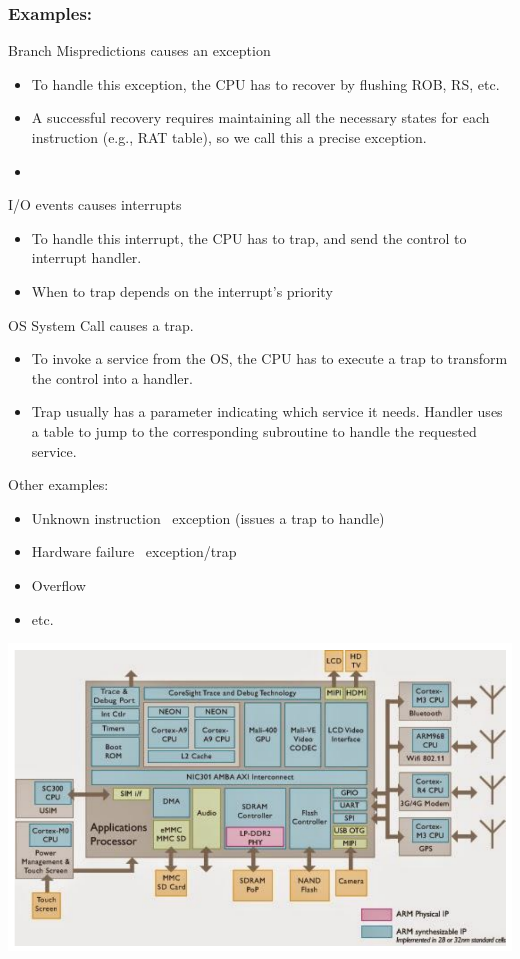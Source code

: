 \documentclass[10pt]{article}
\begin{document}
\subsubsection*{Examples:}
Branch Mispredictions causes an exception
\begin{itemize}
    \item To handle this exception, the CPU has to recover by flushing ROB, RS, etc.
    \item A successful recovery requires maintaining all the necessary states for each instruction (e.g., RAT table), so we call this a precise exception.
    \item 
\end{itemize}
I/O events causes interrupts
\begin{itemize}
    \item To handle this interrupt, the CPU has to trap, and send the control to interrupt handler.
    \item When to trap depends on the interrupt's priority
\end{itemize}
OS System Call causes a trap.
\begin{itemize}
    \item To invoke a service from the OS, the CPU has to execute a trap to transform the control into a handler.
    \item Trap usually has a parameter indicating which service it needs.  Handler uses a table to jump to the corresponding subroutine to handle the requested service.
\end{itemize}
Other examples:
\begin{itemize}
    \item Unknown instruction \textrightarrow~exception (issues a trap to handle)
    \item Hardware failure \textrightarrow~exception/trap
    \item Overflow
    \item etc.
\end{itemize}
\begin{center}
    \includegraphics*[width=\textwidth]{W10_6.png}
\end{center}
\end{document}
